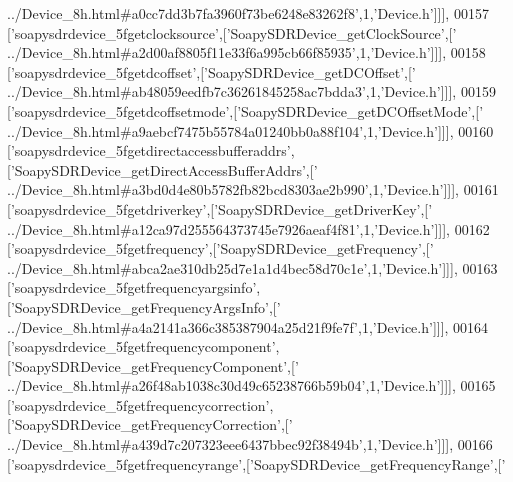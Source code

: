 \begin{DoxyCode}
{      ../Device\_8h.html#a0cc7dd3b7fa3960f73be6248e83262f8'},1,\textcolor{stringliteral}{'Device.h'}]]],
00157   [\textcolor{stringliteral}{'soapysdrdevice\_5fgetclocksource'},[\textcolor{stringliteral}{'SoapySDRDevice\_getClockSource'},[\textcolor{stringliteral}{'
      ../Device\_8h.html#a2d00af8805f11e33f6a995cb66f85935'},1,\textcolor{stringliteral}{'Device.h'}]]],
00158   [\textcolor{stringliteral}{'soapysdrdevice\_5fgetdcoffset'},[\textcolor{stringliteral}{'SoapySDRDevice\_getDCOffset'},[\textcolor{stringliteral}{'
      ../Device\_8h.html#ab48059eedfb7c36261845258ac7bdda3'},1,\textcolor{stringliteral}{'Device.h'}]]],
00159   [\textcolor{stringliteral}{'soapysdrdevice\_5fgetdcoffsetmode'},[\textcolor{stringliteral}{'SoapySDRDevice\_getDCOffsetMode'},[\textcolor{stringliteral}{'
      ../Device\_8h.html#a9aebcf7475b55784a01240bb0a88f104'},1,\textcolor{stringliteral}{'Device.h'}]]],
00160   [\textcolor{stringliteral}{'soapysdrdevice\_5fgetdirectaccessbufferaddrs'},[\textcolor{stringliteral}{'SoapySDRDevice\_getDirectAccessBufferAddrs'},[\textcolor{stringliteral}{'
      ../Device\_8h.html#a3bd0d4e80b5782fb82bcd8303ae2b990'},1,\textcolor{stringliteral}{'Device.h'}]]],
00161   [\textcolor{stringliteral}{'soapysdrdevice\_5fgetdriverkey'},[\textcolor{stringliteral}{'SoapySDRDevice\_getDriverKey'},[\textcolor{stringliteral}{'
      ../Device\_8h.html#a12ca97d255564373745e7926aeaf4f81'},1,\textcolor{stringliteral}{'Device.h'}]]],
00162   [\textcolor{stringliteral}{'soapysdrdevice\_5fgetfrequency'},[\textcolor{stringliteral}{'SoapySDRDevice\_getFrequency'},[\textcolor{stringliteral}{'
      ../Device\_8h.html#abca2ae310db25d7e1a1d4bec58d70c1e'},1,\textcolor{stringliteral}{'Device.h'}]]],
00163   [\textcolor{stringliteral}{'soapysdrdevice\_5fgetfrequencyargsinfo'},[\textcolor{stringliteral}{'SoapySDRDevice\_getFrequencyArgsInfo'},[\textcolor{stringliteral}{'
      ../Device\_8h.html#a4a2141a366c385387904a25d21f9fe7f'},1,\textcolor{stringliteral}{'Device.h'}]]],
00164   [\textcolor{stringliteral}{'soapysdrdevice\_5fgetfrequencycomponent'},[\textcolor{stringliteral}{'SoapySDRDevice\_getFrequencyComponent'},[\textcolor{stringliteral}{'
      ../Device\_8h.html#a26f48ab1038c30d49c65238766b59b04'},1,\textcolor{stringliteral}{'Device.h'}]]],
00165   [\textcolor{stringliteral}{'soapysdrdevice\_5fgetfrequencycorrection'},[\textcolor{stringliteral}{'SoapySDRDevice\_getFrequencyCorrection'},[\textcolor{stringliteral}{'
      ../Device\_8h.html#a439d7c207323eee6437bbec92f38494b'},1,\textcolor{stringliteral}{'Device.h'}]]],
00166   [\textcolor{stringliteral}{'soapysdrdevice\_5fgetfrequencyrange'},[\textcolor{stringliteral}{'SoapySDRDevice\_getFrequencyRange'},[\textcolor{stringliteral}{'
}
\end{DoxyCode}
